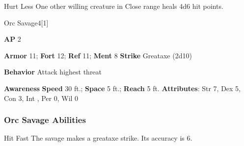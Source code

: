 \vspace{0.5em}
\begin{freeability}{Hurt Less}
One other willing creature in Close range heals 4d6 hit points.
\end{freeability}

\begin{monsection}{Orc Savage}{4}[1]
\vspace{-1em}\vspace{-1em}
\begin{spellcontent}
\begin{spelltargetinginfo}
{\textbf{AP} 2}

\pari \textbf{Armor} 11;
\textbf{Fort} 12;
\textbf{Ref} 11;
\textbf{Ment} 8
\pari \textbf{Strike} Greataxe  (2d10)



\pari \textbf{Behavior} Attack highest threat
\end{spelltargetinginfo}
\end{spellcontent}

\begin{monsterfooter}
\pari \textbf{Awareness} 
\pari \textbf{Speed} 30 ft.;
\textbf{Space} 5 ft.;
\textbf{Reach} 5 ft.
\pari \textbf{Attributes}:
Str 7,
Dex 5,
Con 3,
Int ,
Per 0,
Wil 0
\end{monsterfooter}
\end{monsection}


\subsubsection{Orc Savage Abilities}

\begin{freeability}{Hit Fast}
The savage makes a greataxe strike.
Its accuracy is 6.
\end{freeability}

